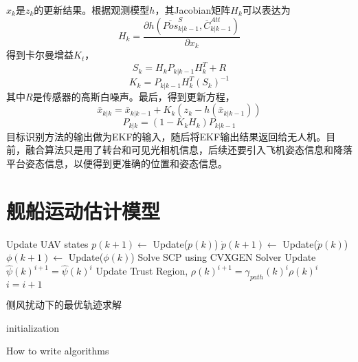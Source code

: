 $x_k$是$z_k$的更新结果。根据观测模型$h$，其Jacobian矩阵$H_k$可以表达为
\begin{equation}
H_k=\frac{\partial h ( \overline{Pos}^S_{k|k-1}, \overline{C}^{Att}_{k|k-1} )}{\partial x_k} 
\end{equation}
得到卡尔曼增益$K_t$，
\begin{equation}
S_k=H_k P_{k|k-1} H^T_k + R
\end{equation}
\begin{equation}
K_k=P_{k|k-1}H^T_k(S_k)^{-1}
\end{equation}
其中$R$是传感器的高斯白噪声。最后，得到更新方程，
\begin{equation}
\bar{x}_{k|k} = \bar{x}_{k|k-1}+K_k(z_k-h(\bar{x}_{k|k-1}))
\end{equation}
\begin{equation}
P_{k|k}=(1-K_k H_k)P_{k|k-1}
\end{equation}
目标识别方法的输出做为EKF的输入，随后将EKF输出结果返回给无人机。目前，融合算法只是用了转台和可见光相机信息，后续还要引入飞机姿态信息和降落平台姿态信息，以便得到更准确的位置和姿态信息。

\section{舰船运动估计模型}
 
\begin{algorithm2e}
	\SetAlgoLined
 	
	{
		Update UAV states \;
		$p(k+1) \leftarrow$ Update($p(k)$)\;
		$\dot{p}(k+1) \leftarrow$ Update($\dot{p}(k)$)\;
		${\phi}(k+1) \leftarrow$ Update(${\phi}(k)$)\;
		Solve SCP using CVXGEN Solver\;
		Update $\hat{\psi}(k)^{i+1} = \hat{\psi}(k)^{i} $\;
		Update Trust Region, $\rho(k)^{i+1} = \gamma_{path}(k)^{i} \rho(k)^{i}$ \;
		$i = i + 1$
	}
	\caption{侧风扰动下的最优轨迹求解}
\end{algorithm2e}

\begin{algorithm2e}[H]
	\SetAlgoLined
	initialization\;
	\caption{How to write algorithms}
\end{algorithm2e}

